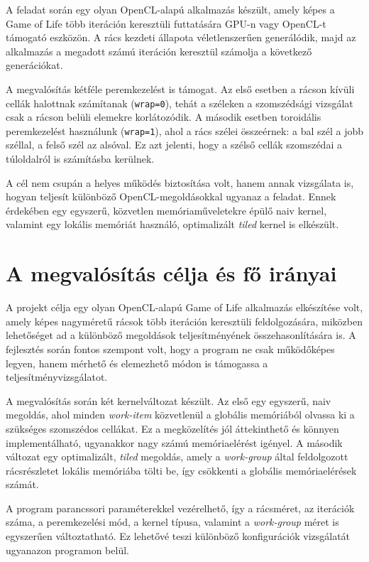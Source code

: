 \documentclass[12pt,a4paper]{article}
\begin{document}
A feladat során egy olyan OpenCL-alapú alkalmazás készült, amely képes a Game of Life több iteráción keresztüli futtatására GPU-n vagy OpenCL-t támogató eszközön. A rács kezdeti állapota véletlenszerűen generálódik, majd az alkalmazás a megadott számú iteráción keresztül számolja a következő generációkat.

A megvalósítás kétféle peremkezelést is támogat. Az első esetben a rácson kívüli cellák halottnak számítanak (\texttt{wrap=0}), tehát a széleken a szomszédsági vizsgálat csak a rácson belüli elemekre korlátozódik. A második esetben toroidális peremkezelést használunk (\texttt{wrap=1}), ahol a rács szélei összeérnek: a bal szél a jobb széllal, a felső szél az alsóval. Ez azt jelenti, hogy a szélső cellák szomszédai a túloldalról is számításba kerülnek.

A cél nem csupán a helyes működés biztosítása volt, hanem annak vizsgálata is, hogyan teljesít különböző OpenCL-megoldásokkal ugyanaz a feladat. Ennek érdekében egy egyszerű, közvetlen memóriaműveletekre épülő naiv kernel, valamint egy lokális memóriát használó, optimalizált \emph{tiled} kernel is elkészült.

\section{A megvalósítás célja és fő irányai}

A projekt célja egy olyan OpenCL-alapú Game of Life alkalmazás elkészítése volt, amely képes nagyméretű rácsok több iteráción keresztüli feldolgozására, miközben lehetőséget ad a különböző megoldások teljesítményének összehasonlítására is. A fejlesztés során fontos szempont volt, hogy a program ne csak működőképes legyen, hanem mérhető és elemezhető módon is támogassa a teljesítményvizsgálatot.

A megvalósítás során két kernelváltozat készült. Az első egy egyszerű, naiv megoldás, ahol minden \emph{work-item} közvetlenül a globális memóriából olvassa ki a szükséges szomszédos cellákat. Ez a megközelítés jól áttekinthető és könnyen implementálható, ugyanakkor nagy számú memóriaelérést igényel. A második változat egy optimalizált, \emph{tiled} megoldás, amely a \emph{work-group} által feldolgozott rácsrészletet lokális memóriába tölti be, így csökkenti a globális memóriaelérések számát.

A program parancssori paraméterekkel vezérelhető, így a rácsméret, az iterációk száma, a peremkezelési mód, a kernel típusa, valamint a \emph{work-group} méret is egyszerűen változtatható. Ez lehetővé teszi különböző konfigurációk vizsgálatát ugyanazon programon belül.
\end{document}
